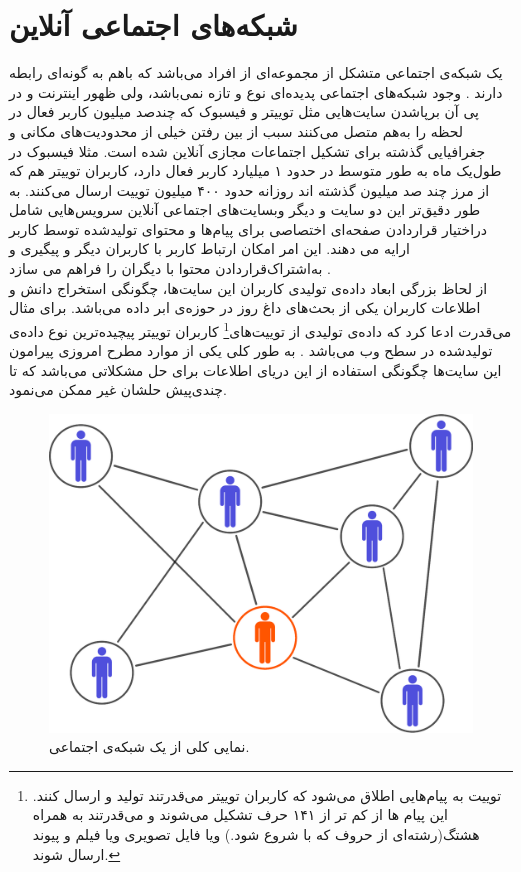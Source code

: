 \section{شبکه‌‌های اجتماعی آنلاین}
\begin{persian}
\noindent
یک شبکه‌ی اجتماعی متشکل از مجموعه‌ای از افراد می‌باشد که با‌هم به گونه‌ای رابطه دارند \cite{easley_networks_2010}. وجود شبکه‌های اجتماعی پدیده‌ای نوع و تازه نمی‌باشد، ولی ظهور اینترنت و در پی آن برپا‌شدن سایت‌‌‌هایی مثل توییتر و فیسبوک که چندصد میلیون کاربر فعال در لحظه را به‌هم متصل می‌کنند سبب از بین رفتن خیلی از محدودیت‌های مکانی و جغرافیایی‌ گذشته برای تشکیل اجتماعات مجازی آنلاین شده است. مثلا فیسبوک در طول‌یک ماه به طور متوسط در حدود ۱ میلیارد \cite{taxidou_realtime_2013} کاربر فعال دارد، کاربران توییتر هم که از مرز چند صد میلیون گذشته اند روزانه حدود ۴۰۰ میلیون توییت ارسال می‌کنند. به طور دقیق‌تر این دو سایت و دیگر وبسایت‌های اجتماعی آنلاین سرویس‌هایی شامل دراختیار قراردادن صفحه‌ای اختصاصی برای پیام‌‌ها و محتوای تولیدشده توسط کاربر ارایه می دهند. این امر امکان ارتباط کاربر با کاربران دیگر و پیگیری و به‌اشتراک‌قراردادن محتوا با دیگران را فراهم می سازد 
\cite{guille_information_2013}.
\\\indent
از لحاظ بزرگی ابعاد داده‌ی تولیدی کاربران این سایت‌ها، چگونگی استخراج دانش و اطلاعات‌ کاربران یکی از بحث‌های داغ روز در حوزه‌ی ابر داده می‌باشد. برای مثال می‌قدرت ادعا کرد که داده‌ی تولیدی از توییت‌های\footnote{ توییت به پیام‌هایی اطلاق می‌شود که کاربران توییتر می‌قدرتند تولید و ارسال کنند. این پیام ‌‌ها از کم تر از ۱۴۱ حرف تشکیل می‌شوند و می‌قدرتند به همراه هشتگ(رشته‌ای از حروف که با \lr{\#} شروع شود.) و‌یا فایل تصویری و‌یا فیلم و پیوند ارسال شوند.} کاربران توییتر پیچیده‌ترین نوع داده‌ی تولید‌شده در سطح وب می‌باشد \cite{krishnan_data_2013}.
به طور کلی‌ یکی از موارد مطرح امروزی پیرامون این سایت‌ها چگونگی استفاده از این دریای اطلاعات برای حل مشکلاتی می‌باشد که تا چندی‌پیش حلشان غیر ممکن می‌نمود.
 \begin{figure}[H]
 \centering
 \includegraphics[scale=0.25]{figures/sn1}
 \caption[شبکه‌ی اجتماعی]
 {نمایی کلی از ‌یک شبکه‌ی اجتماعی.}
\end{figure}
\indent
\end{persian}
